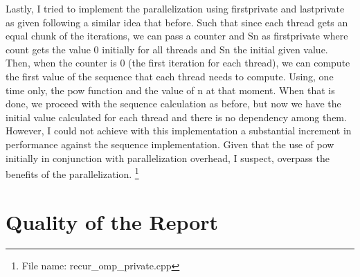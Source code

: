\documentclass[unicode,11pt,a4paper,oneside,numbers=endperiod,openany]{scrartcl}
\begin{document}
Lastly, I tried to implement the parallelization using firstprivate and lastprivate as given following a similar idea that before. 
Such that since each thread gets an equal chunk of the iterations, we can pass a counter and Sn as firstprivate where count gets the value 0 initially
for all threads and Sn the initial given value. Then, when the counter is 0 (the first iteration for each thread), we can compute the first value of the sequence that 
each thread needs to compute. Using, one time only, the pow function and the value of n at that moment. When that is done, we proceed with the sequence calculation as 
before, but now we have the initial value calculated for each thread and there is no dependency among them. However, I could not achieve with this implementation
a substantial increment in performance against the sequence implementation. Given that the use of pow initially in conjunction with parallelization overhead, 
I suspect, overpass the benefits of the parallelization.
\footnote{File name: recur\_omp\_private.cpp}

\section{Quality of the Report }
\end{document}
